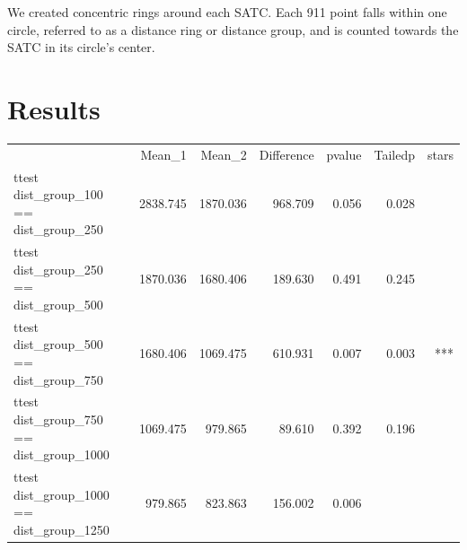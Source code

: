 \documentclass[12pt]{article}
\begin{document}
We created concentric rings around each SATC. Each 911 point falls within one circle, referred to as a distance ring or distance group, and is counted towards the SATC in its circle's center.


\section{Results}
\label{sec:result}
\begin{table}[h]
\centering
\begin{tabular}{lllllll}
\cline{1-7}
\multicolumn{1}{c}{} &
  \multicolumn{1}{|r}{Mean\_1} &
  \multicolumn{1}{r}{Mean\_2} &
  \multicolumn{1}{r}{Difference} &
  \multicolumn{1}{r}{p\-value} &
  \multicolumn{1}{r}{Tailed\-p} &
  \multicolumn{1}{r}{stars} \\
\cline{1-7}
\multicolumn{1}{l}{ttest dist\_group\_100 == dist\_group\_250} &
  \multicolumn{1}{|r}{2838.745} &
  \multicolumn{1}{r}{1870.036} &
  \multicolumn{1}{r}{968.709} &
  \multicolumn{1}{r}{0.056} &
  \multicolumn{1}{r}{0.028} &
  \multicolumn{1}{r}{} \\
\multicolumn{1}{l}{ttest dist\_group\_250 == dist\_group\_500} &
  \multicolumn{1}{|r}{1870.036} &
  \multicolumn{1}{r}{1680.406} &
  \multicolumn{1}{r}{189.630} &
  \multicolumn{1}{r}{0.491} &
  \multicolumn{1}{r}{0.245} &
  \multicolumn{1}{r}{} \\
\multicolumn{1}{l}{ttest dist\_group\_500 == dist\_group\_750} &
  \multicolumn{1}{|r}{1680.406} &
  \multicolumn{1}{r}{1069.475} &
  \multicolumn{1}{r}{610.931} &
  \multicolumn{1}{r}{0.007} &
  \multicolumn{1}{r}{0.003} &
  \multicolumn{1}{r}{***} \\
\multicolumn{1}{l}{ttest dist\_group\_750 == dist\_group\_1000} &
  \multicolumn{1}{|r}{1069.475} &
  \multicolumn{1}{r}{979.865} &
  \multicolumn{1}{r}{89.610} &
  \multicolumn{1}{r}{0.392} &
  \multicolumn{1}{r}{0.196} &
  \multicolumn{1}{r}{} \\
\multicolumn{1}{l}{ttest dist\_group\_1000 == dist\_group\_1250} &
  \multicolumn{1}{|r}{979.865} &
  \multicolumn{1}{r}{823.863} &
  \multicolumn{1}{r}{156.002} &
  \multicolumn{1}{r}{0.006} &

\end{tabular}
\end{table}
\end{document}
